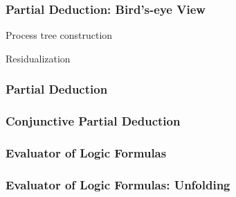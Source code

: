 \documentclass[xcolor=table]{beamer}
\begin{document}
\begin{frame}[fragile]
  \transwipe[direction=90]
  \frametitle{Partial Deduction: Bird's-eye View}
  \begin{center}
  \end{center}

  Process tree construction

\begin{center}
  
\end{center}

Residualization

\begin{center}
\end{center}

\end{frame}

\begin{frame}[fragile]
  \transwipe[direction=90]
  \frametitle{Partial Deduction}

\begin{center}
  
\end{center}

\end{frame}

\begin{frame}[fragile]
  \transwipe[direction=90]
  \frametitle{Conjunctive Partial Deduction}

\begin{center}
  
\end{center}
\end{frame}

\begin{frame}[fragile]
  \transwipe[direction=90]
  \frametitle{Evaluator of Logic Formulas}

\begin{center}
  
\end{center}
\end{frame}

\begin{frame}[fragile]
  \transwipe[direction=90]
  \frametitle{Evaluator of Logic Formulas: Unfolding}

\begin{center}
  
\end{center}
\end{frame}
\end{document}
